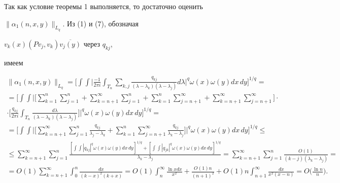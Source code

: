 Так как условие теоремы 1 выполняется, то достаточно оценить


$\|\alpha_1(n,x,y)\|_{L_q}$. Из (1) и (7), обозначая


$v_k(x)(Pv_j,v_k)\overline{v_j(y)}$ через $q_{kj}$,


имеем


\begin{multline*}


\|\alpha_1(n,x,y)\|_{L_q}=\bigg[


\int\int\bigg|\frac{-1}{2\pi i}\int_{T_n}\sum_{k,j}


\frac{q_{kj}}


{(\lambda-\lambda_k)(\lambda-\lambda_j)}d\lambda


\bigg|^q\omega(x)\omega(y)dx\,dy\bigg]^{1/q}= \\


%


=\bigg[\int\int\bigg|\bigg[


\sum_{k=1}^n\sum_{j=1}^n+\sum_{k=n+1}^\infty\sum_{j=1}^n+


\sum_{k=1}^n\sum_{j=n+1}^\infty+\sum_{k=n+1}^\infty\sum_{j=n+1}^\infty


\bigg]\cdot \\


\cdot\bigg[\frac{q_{kj}}{2\pi i}\int_{T_n}\frac{d\lambda}


{(\lambda-\lambda_k)(\lambda-\lambda_j)}\bigg]


\bigg|^q\omega(x)\omega(y)dx\,dy\bigg]^{1/q}= \\


%


=\bigg[\int\int\bigg|\bigg[


\sum_{k=n+1}^\infty\sum_{j=1}^n\frac{q_{kj}}{\lambda_j-\lambda_k}+


\sum_{k=1}^n\sum_{j=n+1}^\infty\frac{q_{kj}}{\lambda_k-\lambda_j}


\bigg]\bigg|^q\omega(x)\omega(y)dx\,dy\bigg]^{1/q}\le \\


%


\le\sum_{k=n+1}^\infty\sum_{j=1}^n


\frac{[\int\int|q_{kj}|^q\omega(x)\omega(y)dx\,dy]^{1/q}+


[\int\int|q_{jk}|^q\omega(x)\omega(y)dx\,dy]^{1/q}}


{\lambda_k-\lambda_j}=


\sum_{k=n+1}^\infty\sum_{j=1}^n\frac{O(1)}{(k-j)(\lambda_k-\lambda_j)}= \\


%


=O(1)\sum_{k=n+1}^\infty\int_0^n\frac{dx}{(k-x)^2(k+x)} =


O(1)\int_n^\infty\frac{\ln x dx}{x^2}+\frac{O(1)n}{(n+1)^2}+


O(1)n\int_{n+1}^\infty\frac{dx}{x^2(x-n)}=


O\bigg(\frac{\ln n}{n}\bigg).


\end{multline*}


